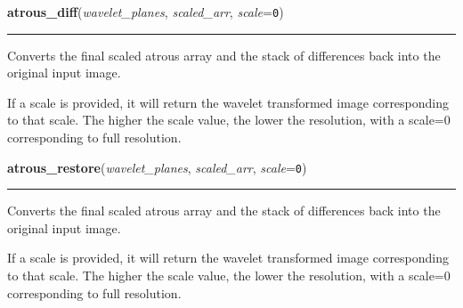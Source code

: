     \label{multireg:atrous:atrous_diff}
    \vspace{0.5ex}

    \begin{boxedminipage}{\textwidth}

    \raggedright \textbf{atrous\_diff}(\textit{wavelet\_planes}, \textit{scaled\_arr}, \textit{scale}=\texttt{0\-})

    \vspace{-1.5ex}

    \rule{\textwidth}{0.5\fboxrule}
    Converts the final scaled atrous array and the stack of differences 
    back into the original input image.

    If a scale is provided, it will return the wavelet transformed image 
    corresponding to that scale. The higher the scale value, the lower 
    the resolution, with a scale=0 corresponding to full resolution.

    \vspace{1ex}

    \end{boxedminipage}

    \label{multireg:atrous:atrous_restore}
    \vspace{0.5ex}

    \begin{boxedminipage}{\textwidth}

    \raggedright \textbf{atrous\_restore}(\textit{wavelet\_planes}, \textit{scaled\_arr}, \textit{scale}=\texttt{0\-})

    \vspace{-1.5ex}

    \rule{\textwidth}{0.5\fboxrule}
    Converts the final scaled atrous array and the stack of differences 
    back into the original input image.

    If a scale is provided, it will return the wavelet transformed image 
    corresponding to that scale. The higher the scale value, the lower 
    the resolution, with a scale=0 corresponding to full resolution.

    \vspace{1ex}

    \end{boxedminipage}

    \label{multireg:atrous:atrousmed}
    \vspace{0.5ex}

